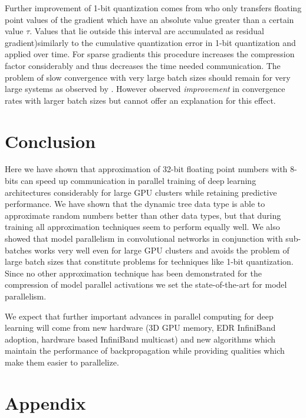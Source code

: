 \documentclass{article} %
\begin{document}
Further improvement of 1-bit quantization comes from \citet{strom2015scalable} who only transfers floating point values of the gradient which have an absolute value greater than a certain value $\tau$. Values that lie outside this interval are accumulated as residual gradient)similarly to the cumulative quantization error in 1-bit quantization and applied over time. For sparse gradients this procedure increases the compression factor considerably and thus decreases the time needed communication. The problem of slow convergence with very large batch sizes should remain for very large systems as observed by \citet{krizhevsky2014one}. However \citet{strom2015scalable} observed {\it improvement} in convergence rates with larger batch sizes but cannot offer an explanation for this effect. 

\section*{Conclusion}

Here we have shown that approximation of 32-bit floating point numbers with 8-bits can speed up communication in parallel training of deep learning architectures considerably for large GPU clusters while retaining predictive performance. We have shown that the dynamic tree data type is able to approximate random numbers better than other data types, but that during training all approximation techniques seem to perform equally well. We also showed that model parallelism in convolutional networks in conjunction with sub-batches works very well even for large GPU clusters and avoids the problem of large batch sizes that constitute problems for techniques like 1-bit quantization. Since no other approximation technique has been demonstrated for the compression of model parallel activations we set the state-of-the-art for model parallelism.

We expect that further important advances in parallel computing for deep learning will come from new hardware (3D GPU memory, EDR InfiniBand adoption, hardware based InfiniBand multicast) and new algorithms which maintain the performance of backpropagation while providing qualities which make them easier to parallelize. 




\newpage
\section*{Appendix}
\end{document}

